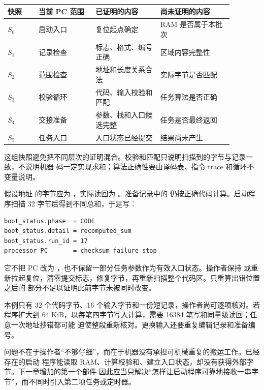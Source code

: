 \begin{longtable}{|L{0.12\linewidth}|L{0.22\linewidth}|L{0.25\linewidth}|L{0.29\linewidth}|}
\hline
{}
快照 & 当前 PC 范围 & 已证明的内容 & 尚未证明的内容 \\ \hline
\(S_0\) & 启动入口 & 复位起点确定 & RAM 是否属于本批次 \\ \hline
\(S_1\) & 记录检查 & 标志、格式、编号正确 & 区域内容完整性 \\ \hline
\(S_2\) & 范围检查 & 地址和长度关系合法 & 实际字节是否匹配 \\ \hline
\(S_3\) & 校验循环 & 代码、输入校验和匹配 & 任务算法是否正确 \\ \hline
\(S_4\) & 交接准备 & 参数、栈和入口候选完整 & 任务是否最终返回 \\ \hline
\(S_5\) & 任务入口 & 入口状态已经提交 & 结果尚未产生 \\ \hline
\end{longtable}

这组快照避免把不同层次的证明混合。校验和匹配只说明扫描到的字节与记录一致，不说明机器
码一定实现求和；算法正确性要由译码表、指令 trace 和循环不变量说明。


假设地址  的字节应为 ，实际读回为 。准备记录中的
 仍按正确代码计算。启动程序扫描 32 字节后得到不同总和，于是写：

\begin{lstlisting}
boot_status.phase  = CODE
boot_status.detail = recomputed_sum
boot_status.run_id = 17
processor PC       = checksum_failure_stop
\end{lstlisting}

它不把 PC 改为 ，也不保留一部分任务参数作为有效入口状态。操作者保持
或重新拉起复位，清零提交标志，修复字节，再重新扫描整个代码区。只重算出错位置之后的
部分不足以证明此前字节未被同时改变。


本例只有 32 个代码字节、16 个输入字节和一份短记录，操作者尚可逐项核对。若程序扩大到
64 KiB，以每笔四字节写入计算，需要 16384 笔写和同量级读回；任意一次地址抄错都可能
迫使整段重新核对。更换输入还要重复编辑记录和准备编号。

问题不在于操作者“不够仔细”，而在于机器没有承担可机械重复的搬运工作。已经存在的启动
程序能读取 RAM、计算校验和、建立入口状态，却没有获得外部字节。下一章增加的第一个部件
因此应当只解决“怎样让启动程序可靠地接收一串字节”，而不同时引入第二项任务或定时器。
